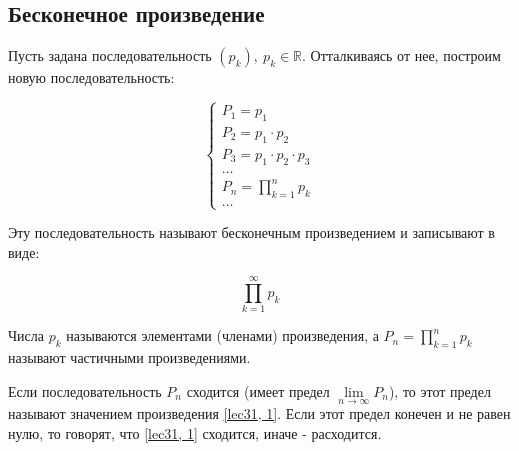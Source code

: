 \documentclass[../../main.tex]{subfiles}
\begin{document}
	\subsection{Бесконечное произведение}

	Пусть задана последовательность $(p_k),\ p_k \in \mathbb{R}$. Отталкиваясь от нее, построим новую последовательность:

	\[
	\begin{cases}
	P_1 = p_1 \\
	P_2 = p_1 \cdot p_2 \\
	P_3 = p_1 \cdot p_2 \cdot p_3 \\
	\ldots \\
	P_n = \prod\limits_{k = 1}^{n} p_k \\
	\ldots
	\end{cases} 
	\]

	Эту последовательность называют бесконечным произведением и записывают в виде:

	\begin{equation} \label{lec31, 1}
		\prod\limits_{k = 1}^{\infty} p_k
	\end{equation}
	
	Числа $p_k$ называются элементами (членами) произведения, а $P_n = \prod\limits_{k = 1}^{n} p_k$ называют частичными произведениями.
	
	Если последовательность $P_n$ сходится (имеет предел $\lim\limits_{n \to \infty}P_n$), то этот предел называют значением произведения \eqref{lec31, 1}. Если этот предел конечен и не равен нулю, то говорят, что \eqref{lec31, 1} сходится, иначе - расходится.
	
\end{document}
